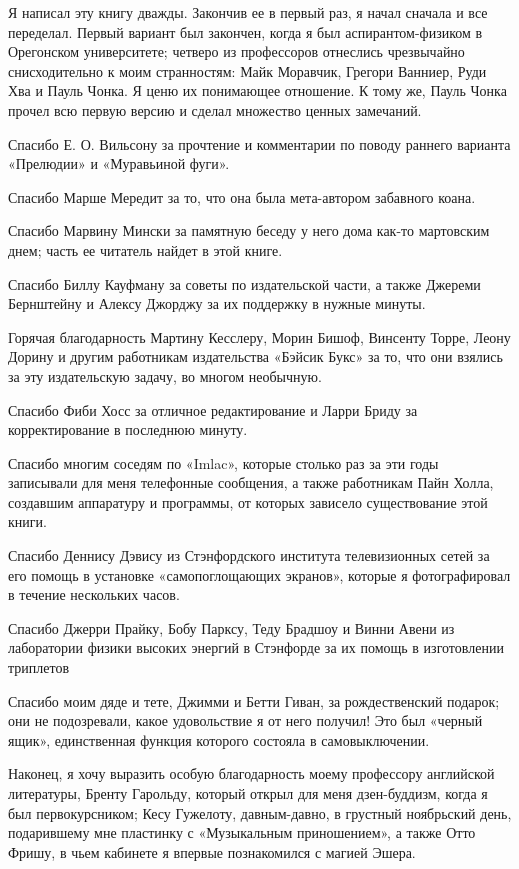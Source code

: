 Я написал эту книгу дважды. Закончив ее в первый раз, я начал сначала и все переделал. Первый вариант был закончен, когда я был аспирантом-физиком в Орегонском университете; четверо из профессоров отнеслись чрезвычайно снисходительно к моим странностям: Майк Моравчик, Грегори Ванниер, Руди Хва и Пауль Чонка. Я ценю их понимающее отношение. К тому же, Пауль Чонка прочел всю первую версию и сделал множество ценных замечаний.

Спасибо Е. О. Вильсону за прочтение и комментарии по поводу раннего варианта «Прелюдии» и «Муравьиной фуги».

Спасибо Марше Мередит за то, что она была мета-автором забавного коана.

Спасибо Марвину Мински за памятную беседу у него дома как-то мартовским днем; часть ее читатель найдет в этой книге.

Спасибо Биллу Кауфману за советы по издательской части, а также Джереми Бернштейну и Алексу Джорджу за их поддержку в нужные минуты.

Горячая благодарность Мартину Кесслеру, Морин Бишоф, Винсенту Торре, Леону Дорину и другим работникам издательства «Бэйсик Букс» за то, что они взялись за эту издательскую задачу, во многом необычную.

Спасибо Фиби Хосс за отличное редактирование и Ларри Бриду за корректирование в последнюю минуту.

Спасибо многим соседям по «Imlac», которые столько раз за эти годы записывали для меня телефонные сообщения, а также работникам Пайн Холла, создавшим аппаратуру и программы, от которых зависело существование этой книги.

Спасибо Деннису Дэвису из Стэнфордского института телевизионных сетей за его помощь в установке «самопоглощающих экранов», которые я фотографировал в течение нескольких часов.

Спасибо Джерри Прайку, Бобу Парксу, Теду Брадшоу и Винни Авени из лаборатории физики высоких энергий в Стэнфорде за их помощь в изготовлении триплетов

Спасибо моим дяде и тете, Джимми и Бетти Гиван, за рождественский подарок; они не подозревали, какое удовольствие я от него получил! Это был «черный ящик», единственная функция которого состояла в самовыключении.

Наконец, я хочу выразить особую благодарность моему профессору английской литературы, Бренту Гарольду, который открыл для меня дзен-буддизм, когда я был первокурсником; Кесу Гужелоту, давным-давно, в грустный ноябрьский день, подарившему мне пластинку с «Музыкальным приношением», а также Отто Фришу, в чьем кабинете я впервые познакомился с магией Эшера.


